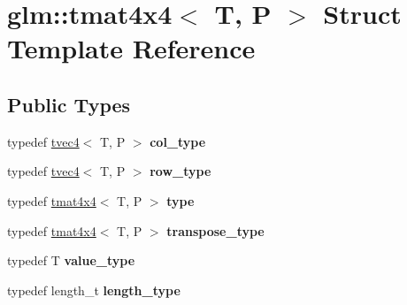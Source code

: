 \hypertarget{structglm_1_1tmat4x4}{}\section{glm\+:\+:tmat4x4$<$ T, P $>$ Struct Template Reference}
\label{structglm_1_1tmat4x4}
\subsection*{Public Types}
\begin{DoxyCompactItemize}
\item 
\mbox{\label{structglm_1_1tmat4x4_ac879ae9669b754551245231ee992a1ea}} 
typedef \hyperlink{structglm_1_1tvec4}{tvec4}$<$ T, P $>$ {\bfseries col\+\_\+type}
\item 
\mbox{\label{structglm_1_1tmat4x4_a496208229e8d8b1bd58b20584eb6011c}} 
typedef \hyperlink{structglm_1_1tvec4}{tvec4}$<$ T, P $>$ {\bfseries row\+\_\+type}
\item 
\mbox{\label{structglm_1_1tmat4x4_a74740b596830a6a4c28f8e33965c9d3e}} 
typedef \hyperlink{structglm_1_1tmat4x4}{tmat4x4}$<$ T, P $>$ {\bfseries type}
\item 
\mbox{\label{structglm_1_1tmat4x4_ad1fd4876433fc643c5445fff52be9dc8}} 
typedef \hyperlink{structglm_1_1tmat4x4}{tmat4x4}$<$ T, P $>$ {\bfseries transpose\+\_\+type}
\item 
\mbox{\label{structglm_1_1tmat4x4_a1317abc40eb95911feacd54ee09cabc5}} 
typedef T {\bfseries value\+\_\+type}
\item 
\mbox{\label{structglm_1_1tmat4x4_aff2734210dc0f3c3c60c49bb1f3e8864}} 
typedef length\+\_\+t {\bfseries length\+\_\+type}
\end{DoxyCompactItemize}
